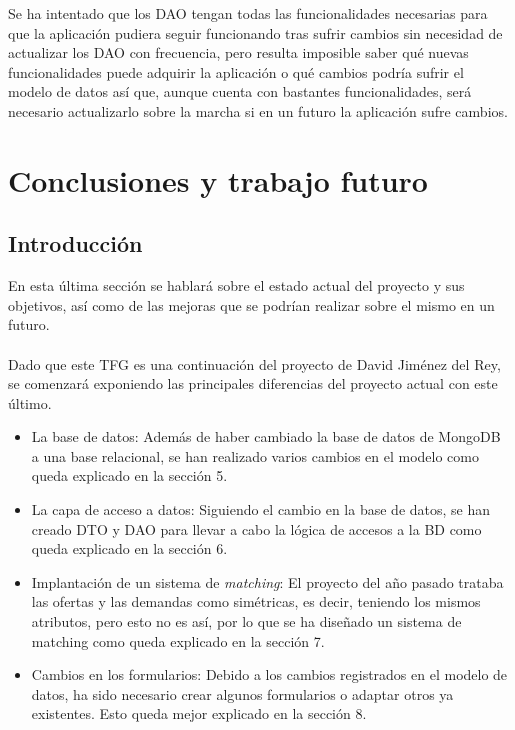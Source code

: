 \documentclass[11pt]{book}
\begin{document}
	Se ha intentado que los DAO tengan todas las funcionalidades necesarias para que la aplicación pudiera seguir funcionando tras sufrir cambios sin necesidad de actualizar los DAO con frecuencia, pero resulta imposible saber qué nuevas funcionalidades puede adquirir la aplicación o qué cambios podría sufrir el modelo de datos así que, aunque cuenta con bastantes funcionalidades, será necesario actualizarlo sobre la marcha si en un futuro la aplicación sufre cambios.
	
	
	\chapter{Conclusiones y trabajo futuro}
	\section{Introducción}
	En esta última sección se hablará sobre el estado actual del proyecto y sus objetivos, así como de las mejoras que se podrían realizar sobre el mismo en un futuro.\\\\
	
	Dado que este TFG es una continuación del proyecto de David Jiménez del Rey, se comenzará exponiendo las principales diferencias del proyecto actual con este último.
	\begin{itemize}
		\item La base de datos: Además de haber cambiado la base de datos de MongoDB a una base relacional, se han realizado varios cambios en el modelo 		como queda explicado en la sección 5.
		\item La capa de acceso a datos: Siguiendo el cambio en la base de datos, se han creado DTO y DAO para llevar a cabo la lógica de accesos a la BD 			como queda explicado en la sección 6.
		\item Implantación de un sistema de \emph{matching}: El proyecto del año pasado trataba las ofertas y las demandas como simétricas, es decir, teniendo los mismos atributos, pero esto no 	es así, por lo que se ha diseñado un sistema de matching como queda explicado en la sección 7.
		\item Cambios en los formularios: Debido a los cambios registrados en el modelo de datos, ha sido necesario crear algunos formularios o adaptar otros ya existentes. Esto queda mejor explicado en la sección 8.
	\end{itemize}
	
\end{document}

